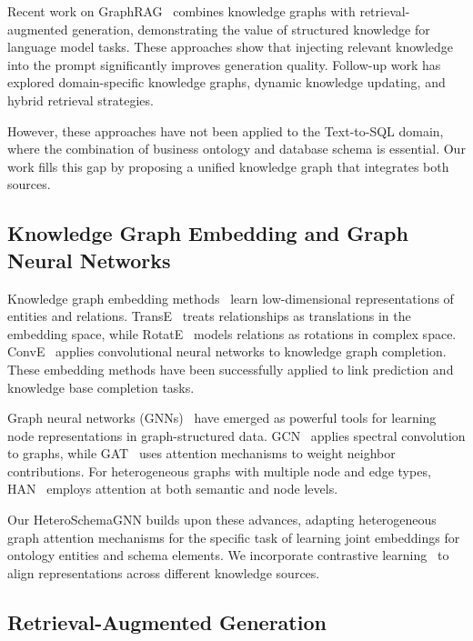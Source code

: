 \documentclass[sigconf, nonatbib]{acmart}
\begin{document}
Recent work on GraphRAG~\cite{edge2024graphrag} combines knowledge graphs with retrieval-augmented generation, demonstrating the value of structured knowledge for language model tasks. These approaches show that injecting relevant knowledge into the prompt significantly improves generation quality. Follow-up work has explored domain-specific knowledge graphs, dynamic knowledge updating, and hybrid retrieval strategies.

However, these approaches have not been applied to the Text-to-SQL domain, where the combination of business ontology and database schema is essential. Our work fills this gap by proposing a unified knowledge graph that integrates both sources.

\subsection{Knowledge Graph Embedding and Graph Neural Networks}

Knowledge graph embedding methods~\cite{wang2017knowledge} learn low-dimensional representations of entities and relations. TransE~\cite{bordes2013transe} treats relationships as translations in the embedding space, while RotatE~\cite{sun2019rotate} models relations as rotations in complex space. ConvE~\cite{dettmers2018conve} applies convolutional neural networks to knowledge graph completion. These embedding methods have been successfully applied to link prediction and knowledge base completion tasks.

Graph neural networks (GNNs)~\cite{hamilton2017inductive,schlichtkrull2018modeling} have emerged as powerful tools for learning node representations in graph-structured data. GCN~\cite{kipf2017semi} applies spectral convolution to graphs, while GAT~\cite{velivckovic2018graph} uses attention mechanisms to weight neighbor contributions. For heterogeneous graphs with multiple node and edge types, HAN~\cite{wang2019heterogeneous} employs attention at both semantic and node levels.

Our HeteroSchemaGNN builds upon these advances, adapting heterogeneous graph attention mechanisms for the specific task of learning joint embeddings for ontology entities and schema elements. We incorporate contrastive learning~\cite{chen2020simple,oord2018representation} to align representations across different knowledge sources.

\subsection{Retrieval-Augmented Generation}
\end{document}
